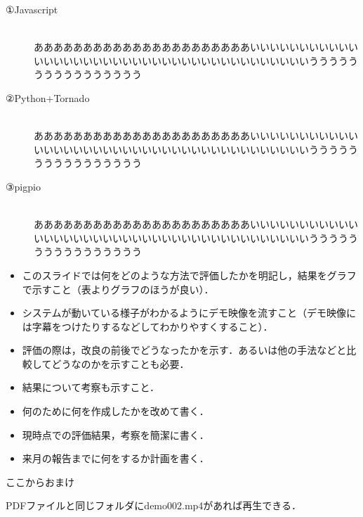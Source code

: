 \begin{description} 
	\item[①Javascript]~\\
	ああああああああああああああああああああああいいいいいいいいいいいいいいいいいいいいいいいいいいいいいいいいいいいいいいいうううううううううううううううう
	\item[②Python+Tornado]~\\
	ああああああああああああああああああああああいいいいいいいいいいいいいいいいいいいいいいいいいいいいいいいいいいいいいいいうううううううううううううううう
	\item[③pigpio]~\\
	ああああああああああああああああああああああいいいいいいいいいいいいいいいいいいいいいいいいいいいいいいいいいいいいいいいうううううううううううううううう
\end{description}
\newpage


\begin{itemize}
	\item このスライドでは何をどのような方法で評価したかを明記し，結果をグラフで示すこと（表よりグラフのほうが良い）．
	\item システムが動いている様子がわかるようにデモ映像を流すこと（デモ映像には字幕をつけたりするなどしてわかりやすくすること）．
	\item 評価の際は，改良の前後でどうなったかを示す．あるいは他の手法などと比較してどうなのかを示すことも必要．
	\item 結果について考察も示すこと．
\end{itemize}
\newpage

\label{MUSUBI}
\begin{itemize}
	\item 何のために何を作成したかを改めて書く．
	\item 現時点での評価結果，考察を簡潔に書く．
	\item 来月の報告までに何をするか計画を書く．
\end{itemize}
\newpage

ここからおまけ

\href{run:./demo002.mp4}{\textcolor[hsb]{0.0, 0.7, 1.0}{\faPlayCircle[regular]}} PDFファイルと同じフォルダにdemo002.mp4があれば再生できる．


